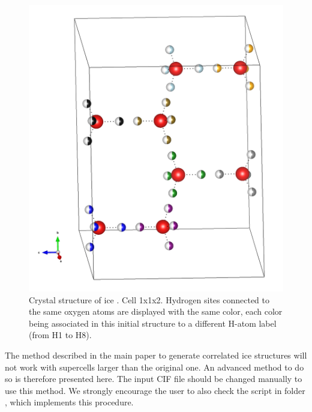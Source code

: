\documentclass[a4paper,10pt]{article}
\begin{document}
\begin{figure}[t]
  \caption{ Crystal structure of ice . Cell 1x1x2. Hydrogen sites connected to the same oxygen atoms are displayed with the same color, each color being associated in this initial structure to a different H-atom label (from H1 to H8). }   
  
  \centering
  \includegraphics[scale=0.20]{figures/ice-Ih-121-adv.png}
  
  \label{fig:iceIh-adv}
\end{figure}

The method described in the main paper to generate correlated ice  structures will not work with supercells larger than the original one. An advanced method to do so is therefore presented here. The input CIF file should be changed manually to use this method. We strongly encourage the user to also check the  script in folder , which implements this procedure. 
\end{document}
